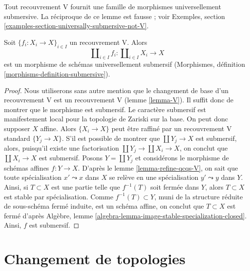 \noindent
Tout recouvrement V fournit une famille de morphismes universellement submersive.
La réciproque de ce lemme est fausse ; voir
Exemples, section \ref{examples-section-universally-submersive-not-V}.

\begin{lemma}
\label{lemma-V-covering-universally-submersive}
Soit $\{f_i : X_i \to X\}_{i \in I}$ un recouvrement V.
Alors
$$
\coprod\nolimits_{i \in I} f_i :
\coprod\nolimits_{i \in I} X_i
\longrightarrow
X
$$
est un morphisme de schémas universellement submersif (Morphismes, définition
\ref{morphisms-definition-submersive}).
\end{lemma}

\begin{proof}
Nous utiliserons sans autre mention que le changement de base d'un recouvrement V
est un recouvrement V (lemme \ref{lemma-V}). Il suffit donc
de montrer que le morphisme est submersif.
Le caractère submersif est manifestement local pour la topologie de Zariski sur la base.
On peut donc supposer $X$ affine. Alors $\{X_i \to X\}$
peut être raffiné par un recouvrement V standard $\{Y_j \to X\}$.
S'il est possible de montrer que $\coprod Y_j \to X$ est submersif,
alors, puisqu'il existe une factorisation $\coprod Y_j \to \coprod X_i \to X$,
on conclut que $\coprod X_i \to X$ est submersif.
Posons $Y = \coprod Y_j$ et considérons le morphisme de schémas affines
$f : Y \to X$.
D'après le lemme \ref{lemma-refine-qcqs-V}, on sait que toute
spécialisation $x' \leadsto x$ dans $X$ se relève en une spécialisation
$y' \leadsto y$ dans $Y$.
Ainsi, si $T \subset X$ est une partie telle que $f^{-1}(T)$
soit fermée dans $Y$, alors $T \subset X$ est stable par spécialisation.
Comme $f^{-1}(T) \subset Y$, muni de la structure réduite
de sous-schéma fermé induite, est un schéma affine, on conclut que
$T \subset X$ est fermé d'après Algèbre, lemme
\ref{algebra-lemma-image-stable-specialization-closed}.
Ainsi, $f$ est submersif.
\end{proof}





















\section{Changement de topologies}
\label{section-change-topologies}

